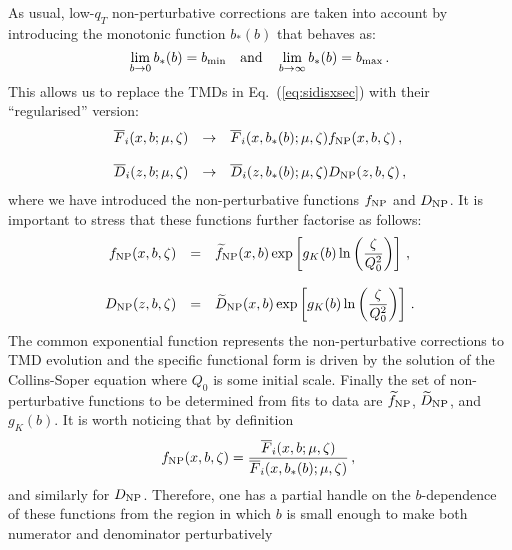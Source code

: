\documentclass[10pt,a4paper]{article}
\begin{document}
As usual, low-$q_T$ non-perturbative corrections are taken into
account by introducing the monotonic function $b_*(b)$ that behaves
as:
\begin{equation}
  \lim_{b\rightarrow 0}
  b_*(b) = b_{\rm min}\quad\mbox{and}\quad\lim_{b\rightarrow \infty}
  b_*(b) = b_{\rm max}\,.
\end{equation}
This allows us to replace the TMDs in Eq.~(\ref{eq:sidisxsec}) with
their ``regularised'' version:
\begin{equation}\label{eq:fandDNP}
\begin{array}{rcl}
  \overline{F}_i(x,b;\mu,\zeta) &\rightarrow&
  \overline{F}_i(x,b_*(b);\mu,\zeta) f_{\rm NP}(x,b,\zeta)\,,\\
\\
  \overline{D}_i(z,b;\mu,\zeta) &\rightarrow&
  \overline{D}_i(z,b_*(b);\mu,\zeta) D_{\rm NP}(z,b,\zeta)\,,
\end{array}
\end{equation}
where we have introduced the non-perturbative functions $f_{\rm NP}$
and $D_{\rm NP}$. It is important to stress that these functions
further factorise as follows:
\begin{equation}\label{NPfuncts}
\begin{array}{rcl}
f_{\rm NP}(x,b,\zeta)&=&\displaystyle\widetilde{f}_{\rm NP}(x,b)\exp\left[g_K(b)\ln\left(\frac{\zeta}{Q_0^2}\right)\right]\,,\\
\\
D_{\rm NP}(z,b,\zeta) &=&\displaystyle\widetilde{D}_{\rm NP}(x,b)\exp\left[g_K(b)\ln\left(\frac{\zeta}{Q_0^2}\right)\right]\,.
\end{array}
\end{equation}
The common exponential function represents the non-perturbative
corrections to TMD evolution and the specific functional form is
driven by the solution of the Collins-Soper equation where $Q_0$ is
some initial scale. Finally the set of non-perturbative functions to
be determined from fits to data are $\widetilde{f}_{\rm NP}$,
$\widetilde{D}_{\rm NP}$, and $g_K(b)$. It is worth noticing that by definition
\begin{equation}
 f_{\rm NP}(x,b,\zeta) = \frac{\overline{F}_i(x,b;\mu,\zeta)}{\overline{F}_i(x,b_*(b);\mu,\zeta)} \,,\\
\end{equation}
and similarly for $D_{\rm NP}$. Therefore, one has a partial handle on
the $b$-dependence of these functions from the region in which $b$ is
small enough to make both numerator and denominator perturbatively
\end{document}

